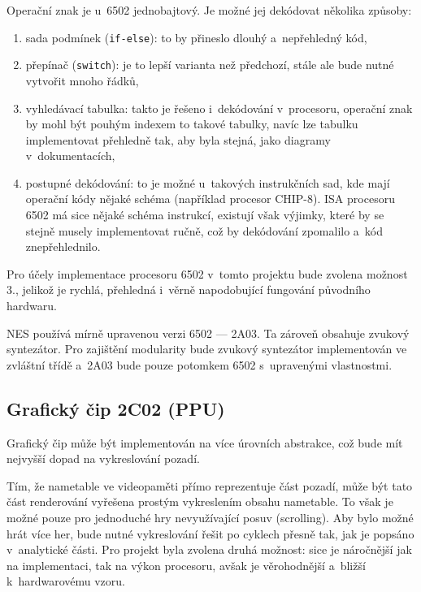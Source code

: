 Operační znak je u~6502 jednobajtový. Je možné jej dekódovat několika způsoby:
\begin{enumerate}
	\item sada podmínek (\texttt{if-else}): to by přineslo dlouhý a~nepřehledný kód,
	\item přepínač (\texttt{switch}): je to lepší varianta než předchozí, stále ale bude nutné vytvořit mnoho řádků,
	\item vyhledávací tabulka: takto je řešeno i~dekódování v~procesoru, operační znak by mohl být pouhým indexem to takové tabulky, navíc lze tabulku implementovat přehledně tak, aby byla stejná, jako diagramy v~dokumentacích,
	\item postupné dekódování: to je možné u~takových instrukčních sad, kde mají operační kódy nějaké schéma (například procesor CHIP-8). ISA procesoru 6502 má sice nějaké schéma instrukcí, existují však výjimky, které by se stejně musely implementovat ručně, což by dekódování zpomalilo a~kód znepřehlednilo.
\end{enumerate}

Pro účely implementace procesoru 6502 v~tomto projektu bude zvolena možnost 3., jelikož je rychlá, přehledná i~věrně napodobující fungování původního hardwaru.

NES používá mírně upravenou verzi 6502 --- 2A03. Ta zároveň obsahuje zvukový syntezátor. Pro zajištění modularity bude zvukový syntezátor implementován ve zvláštní třídě a~2A03 bude pouze potomkem 6502 s~upravenými vlastnostmi.

\subsection{Grafický čip 2C02 (PPU)}
Grafický čip může být implementován na více úrovních abstrakce, což bude mít nejvyšší dopad na vykreslování pozadí.

Tím, že nametable ve videopaměti přímo reprezentuje část pozadí, může být tato část renderování vyřešena prostým vykreslením obsahu nametable. To však je možné pouze pro jednoduché hry nevyužívající posuv (scrolling). Aby bylo možné hrát více her, bude nutné vykreslování řešit po cyklech přesně tak, jak je popsáno v~analytické části. Pro projekt byla zvolena druhá možnost: sice je náročnější jak na implementaci, tak na výkon procesoru, avšak je věrohodnější a~bližší k~hardwarovému vzoru.

